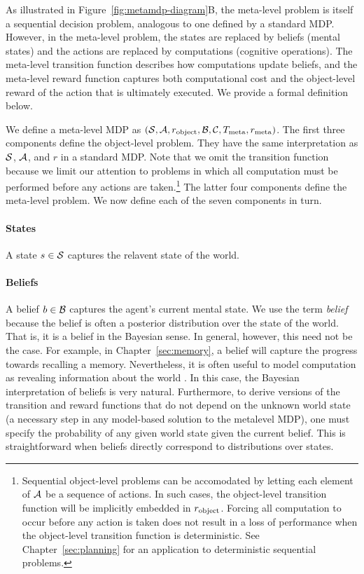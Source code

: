 As illustrated in Figure~\ref{fig:metamdp-diagram}B, the meta-level problem is itself a sequential decision problem, analogous to one defined by a standard MDP. However, in the meta-level problem, the states are replaced by beliefs (mental states) and the actions are replaced by computations (cognitive operations). The meta-level transition function describes how computations update beliefs, and the meta-level reward function captures both computational cost and the object-level reward of the action that is ultimately executed. We provide a formal definition below.

We define a meta-level MDP as $(\S, \A, r\object, \B, \C, T\meta, r\meta)$. The first three components define the object-level problem. They have the same interpretation as $\S$, $\A$, and $r$ in a standard MDP. Note that we omit the transition function because we limit our attention to problems in which all computation must be performed before any actions are taken.\footnote{%
  Sequential object-level problems can be accomodated by letting each element of $\A$ be a sequence of actions. In such cases, the object-level transition function will be implicitly embedded in $r\object$. Forcing all computation to occur before any action is taken does not result in a loss of performance when the object-level transition function is deterministic. See Chapter~\ref{sec:planning} for an application to deterministic sequential problems.
} The latter four components define the meta-level problem. We now define each of the seven components in turn.

\paragraph{States}
A state $s \in \S$ captures the relavent state of the world.

\paragraph{Beliefs}
A belief $b \in \B$ captures the agent's current mental state. We use the term \emph{belief} because the belief is often a posterior distribution over the state of the world. That is, it is a belief in the Bayesian sense. In general, however, this need not be the case. For example, in Chapter~\ref{sec:memory}, a belief will capture the progress towards recalling a memory. Nevertheless, it is often useful to model computation as revealing information about the world \citep{matheson1968economic}. In this case, the Bayesian interpretation of beliefs is very natural. Furthermore, to derive versions of the transition and reward functions that do not depend on the unknown world state (a necessary step in any model-based solution to the metalevel MDP), one must specify the probability of any given world state given the current belief. This is straightforward when beliefs directly correspond to distributions over states.

